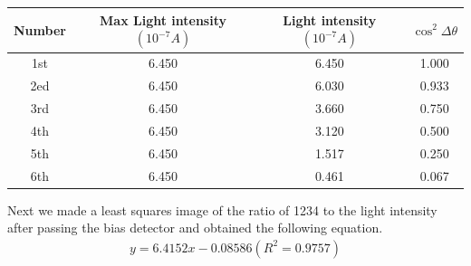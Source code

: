 \documentclass[UTF8]{article}
\begin{document}
		\begin{center}
		\begin{tabular}{cccc}
			\toprule
			Number & Max Light intensity$\left ( 10^{-7}A  \right ) $  & Light intensity$\left ( 10^{-7}A  \right ) $& $\cos ^{2}\Delta \theta   $\\
			\midrule
			1st & 6.450 & 6.450 & 1.000\\
			2ed & 6.450 & 6.030 & 0.933\\
			3rd & 6.450 & 3.660 & 0.750\\
			4th & 6.450 & 3.120 & 0.500\\
			5th & 6.450 & 1.517 & 0.250\\
			6th & 6.450 & 0.461 & 0.067\\
			\bottomrule
		\end{tabular}
	\end{center}
	
	Next we made a least squares image of the ratio of 1234 to the light intensity after passing the bias detector and obtained the following equation.
	 \begin{eqnarray}y=  6.4152x -0.08586\left ( R^{2}= 0.9757 \right ) \end{eqnarray}
	
\end{document}

